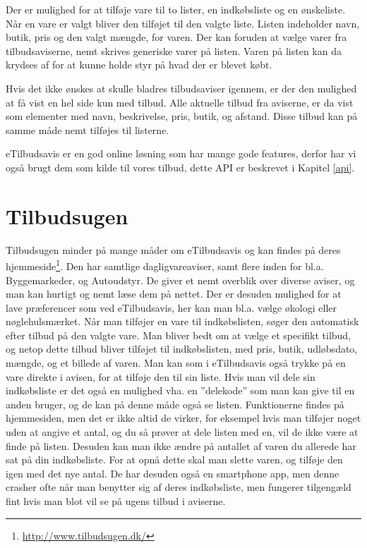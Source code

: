 Der er mulighed for at tilføje vare til to lister, en indkøbsliste og en ønskeliste. 
Når en vare er valgt bliver den tilføjet til den valgte liste.
Listen indeholder navn, butik, pris og den valgt mængde, for varen. 
Der kan foruden at vælge varer fra tilbudsaviserne, nemt skrives generiske varer på listen. Varen på listen kan da krydses af for at kunne holde styr på hvad der er blevet købt.

Hvis det ikke ønskes at skulle bladres tilbudsaviser igennem, er der den mulighed at få vist en hel side kun med tilbud. 
Alle aktuelle tilbud fra aviserne, er da vist som elementer med navn, beskrivelse, pris, butik, og afstand. Disse tilbud kan på samme måde nemt tilføjes til listerne.

eTilbudsavis er en god online løsning som har mange gode features, derfor har vi også brugt dem som kilde til vores tilbud, dette API er beskrevet i Kapitel \ref{api}.

\section{Tilbudsugen}

Tilbudsugen minder på mange måder om eTilbudsavis og kan findes på deres hjemmeside\footnote{\underline{http://www.tilbudsugen.dk/}}. 
Den har samtlige dagligvareaviser, samt flere inden for bl.a. Byggemarkeder, og Autoudstyr.
De giver et nemt overblik over diverse aviser, og man kan hurtigt og nemt læse dem på nettet. 
Der er desuden mulighed for at lave præferencer som ved eTilbudsavis, her kan man bl.a. vælge økologi eller nøglehulsmærket.
Når man tilføjer en vare til indkøbslisten, søger den automatisk efter tilbud på den valgte vare. 
Man bliver bedt om at vælge et specifikt tilbud, og netop dette tilbud bliver tilføjet til indkøbslisten, med pris, butik, udløbsdato, mængde, og et billede af varen.
Man kan som i eTilbudsavis også trykke på en vare direkte i avisen, for at tilføje den til sin liste.
Hvis man vil dele sin indkøbsliste er det også en mulighed vha. en ''delekode'' som man kan give til en anden bruger, og de kan på denne måde også se listen.
Funktionerne findes på hjemmesiden, men det er ikke altid de virker, for eksempel hvis man tilføjer noget uden at angive et antal, og du så prøver at dele listen med en, vil de ikke være at finde på listen.
Desuden kan man ikke ændre på antallet af varen du allerede har sat på din indkøbsliste. 
For at opnå dette skal man slette varen, og tilføje den igen med det nye antal.
De har desuden også en smartphone app, men denne crasher ofte når man benytter sig af deres indkøbsliste, men fungerer tilgengæld fint hvis man blot vil se på ugens tilbud i aviserne.

